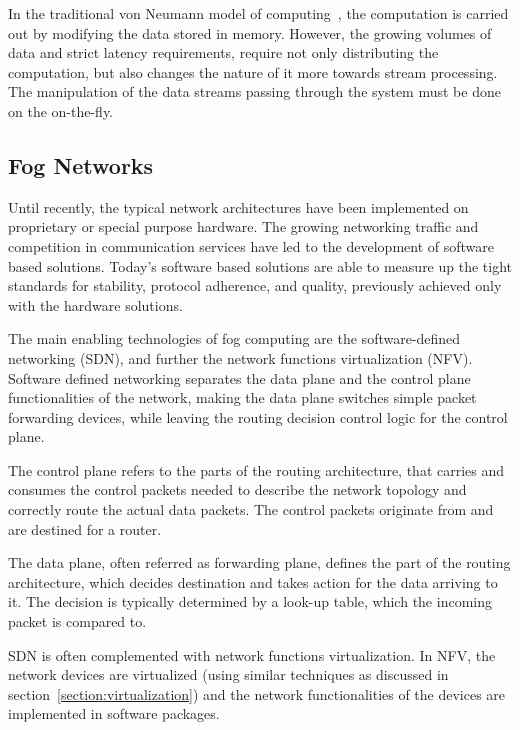 In the traditional von Neumann model of computing~\cite{Neumann:1993:EDVAC}, the computation is carried out by modifying the data stored in memory. However, the growing volumes of data and strict latency requirements, require not only distributing the computation, but also changes the nature of it more towards stream processing. The manipulation of the data streams passing through the system must be done on the on-the-fly.~\cite{Bonomi:2012:Fog, Thies:2002:StreamIt}

\subsection{Fog Networks}

Until recently, the typical network architectures have been implemented on proprietary or special purpose hardware. The growing networking traffic and competition in communication services have led to the development of software based solutions. Today's software based solutions are able to measure up the tight standards for stability, protocol adherence, and quality, previously achieved only with the hardware solutions.~\cite{Kim:2013:SDN}

The main enabling technologies of fog computing are the software-defined networking (SDN), and further the network functions virtualization (NFV). Software defined networking separates the data plane and the control plane functionalities of the network, making the data plane switches simple packet forwarding devices, while leaving the routing decision control logic for the control plane.~\cite{Kim:2013:SDN, Demestichas:2013:NFV}

The control plane refers to the parts of the routing architecture, that carries and consumes the control packets needed to describe the network topology and correctly route the actual data packets. The control packets originate from and are destined for a router.~\cite{Chao:2007:HPS:1202844, Yang:2004:FCE}

The data plane, often referred as forwarding plane, defines the part of the routing architecture, which decides destination and takes action for the data arriving to it. The decision is typically determined by a look-up table, which the incoming packet is compared to.~\cite{Chao:2007:HPS:1202844, Yang:2004:FCE}

SDN is often complemented with network functions virtualization. In NFV, the network devices are virtualized (using similar techniques as discussed in section~\ref{section:virtualization}) and the network functionalities of the devices are implemented in software packages.~\cite{Demestichas:2013:NFV}

